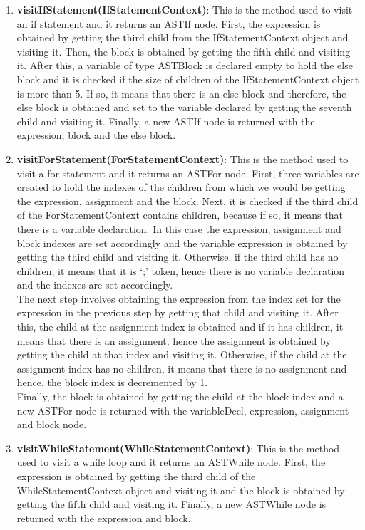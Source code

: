 \documentclass{article}
\begin{document}
\begin{enumerate}
				\item \textbf{visitIfStatement(IfStatementContext)}:  This is the method used to visit an if statement and it returns an ASTIf node. First, the expression is obtained by getting the third child from the IfStatementContext object and visiting it. Then, the block is obtained by getting the fifth child and visiting it. After this, a variable of type ASTBlock is declared empty to hold the else block and it is checked if the size of children of the IfStatementContext object is more than 5. If so, it means that there is an else block and therefore, the else block is obtained and set to the variable declared by getting the seventh child and visiting it. Finally, a new ASTIf node is returned with the expression, block and the else block.
				
				\item \textbf{visitForStatement(ForStatementContext)}:  This is the method used to visit a for statement and it returns an ASTFor node. First, three variables are created to hold the indexes of the children from which we would be getting the expression, assignment and the block. Next, it is checked if the third child of the ForStatementContext contains children, because if so, it means that there is a variable declaration. In this case the expression, assignment and block indexes are set accordingly and the variable expression is obtained by getting the third child and visiting it. Otherwise, if the third child has no children, it means that it is `;' token, hence there is no variable declaration and the indexes are set accordingly.\\
				
				The next step involves obtaining the expression from the index set for the expression in the previous step by getting that child and visiting it. After this, the child at the assignment index is obtained and if it has children, it means that there is an assignment, hence the assignment is obtained by getting the child at that index and visiting it. Otherwise, if the child at the assignment index has no children, it means that there is no assignment and hence, the block index is decremented by 1.\\
				
				Finally, the block is obtained by getting the child at the block index and a new ASTFor node is returned with the variableDecl, expression, assignment and block node.
				
				\item \textbf{visitWhileStatement(WhileStatementContext)}:  This is the method used to visit a while loop and it returns an ASTWhile node. First, the expression is obtained by getting the third child of the WhileStatementContext object and visiting it and the block is obtained by getting the fifth child and visiting it. Finally, a new ASTWhile node is returned with the expression and block.
				

\end{enumerate}
\end{document}
